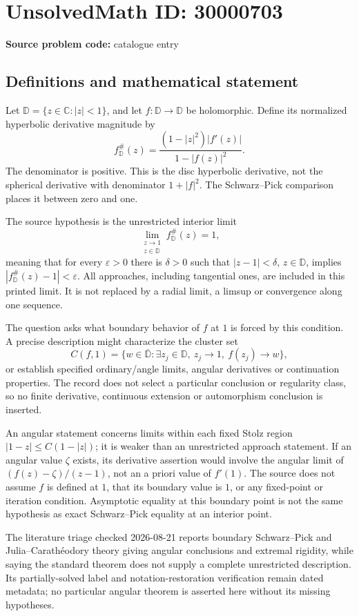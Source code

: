\documentclass[11pt]{article}
\newcommand{\C}{\mathbb{C}}
\begin{document}
\section*{UnsolvedMath ID: 30000703}
\textbf{Source problem code:} catalogue entry
\subsection{Definitions and mathematical statement}
Let \(\mathbb D=\{z\in\C:|z|<1\}\), and let \(f:\mathbb D\to\mathbb D\) be holomorphic. Define its normalized hyperbolic derivative magnitude by
\[
 f^{\#}_{\mathbb D}(z)=
 \frac{(1-|z|^2)|f'(z)|}{1-|f(z)|^2}.
\]
The denominator is positive. This is the disc hyperbolic derivative, not the spherical derivative with denominator \(1+|f|^2\). The Schwarz--Pick comparison places it between zero and one.

The source hypothesis is the unrestricted interior limit
\[
 \lim_{\substack{z\to1\\z\in\mathbb D}}f^{\#}_{\mathbb D}(z)=1,
\]
meaning that for every \(\varepsilon>0\) there is \(\delta>0\) such that \(|z-1|<\delta\), \(z\in\mathbb D\), implies \(|f^{\#}_{\mathbb D}(z)-1|<\varepsilon\). All approaches, including tangential ones, are included in this printed limit. It is not replaced by a radial limit, a limsup or convergence along one sequence.

The question asks what boundary behavior of \(f\) at \(1\) is forced by this condition. A precise description might characterize the cluster set
\[
 C(f,1)=\{w\in\overline{\mathbb D}:\exists z_j\in\mathbb D,
 \ z_j\to1,\ f(z_j)\to w\},
\]
or establish specified ordinary/angle limits, angular derivatives or continuation properties. The record does not select a particular conclusion or regularity class, so no finite derivative, continuous extension or automorphism conclusion is inserted.

An angular statement concerns limits within each fixed Stolz region \(|1-z|\leq C(1-|z|)\); it is weaker than an unrestricted approach statement. If an angular value \(\zeta\) exists, its derivative assertion would involve the angular limit of \((f(z)-\zeta)/(z-1)\), not an a priori value of \(f'(1)\). The source does not assume \(f\) is defined at \(1\), that its boundary value is \(1\), or any fixed-point or iteration condition. Asymptotic equality at this boundary point is not the same hypothesis as exact Schwarz--Pick equality at an interior point.

The literature triage checked 2026-08-21 reports boundary Schwarz--Pick and Julia--Carath\'eodory theory giving angular conclusions and extremal rigidity, while saying the standard theorem does not supply a complete unrestricted description. Its partially-solved label and notation-restoration verification remain dated metadata; no particular angular theorem is asserted here without its missing hypotheses.
\end{document}

